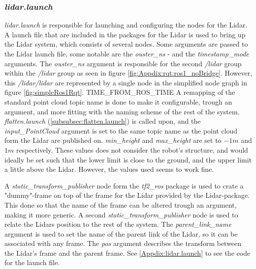 \subsubsection{\textit{lidar.launch}}\label{subsubsec:lidar.launch}
\textit{lidar.launch} is responsible for launching and configuring the nodes for the Lidar. A launch file that are included in the packages for the Lidar is used to bring up the Lidar system, which  consists of several nodes. Some arguments are passed to the Lidar launch file, some notable are the \textit{ouster\_ns} - and the  \textit{timestamp\_mode} arguments. The \textit{ouster\_ns} argument is responsible for the second \textit{/lidar} group within the \textit{/lidar} group as seen in figure \ref{fig:Appdix:rqt:ros1_noBridge}. However, this \textit{/lidar/lidar} are represented by a single node in the simplified node graph in figure \ref{fig:simpleRos1Rqt}. TIME\_FROM\_ROS\_TIME A remapping of the standard point cloud topic name is done to make it configurable, trough an argument, and more fitting with the naming scheme of the rest of the system. \textit{flatten.launch} (\ref{subsubsec:flatten.launch}) is called upon, and the \textit{input\_PointCloud} argument is set to the same topic name as the point cloud form the Lidar are published on. \textit{min\_height} and \textit{max\_height} are set to $-1 m$ and $1 m$ respectively. These values does not consider the robot's structure, and would ideally be set such that the lower limit is close to the ground, and the upper limit a little above the Lidar. However, the values used seems to work fine. 

A \textit{static\_transform\_publisher} node form the \textit{tf2\_ros} package is used to crate a "dummy"-frame on top of the frame for the Lidar provided by the Lidar-package. This done so that the name of the frame can be altered trough an argument, making it more generic. A second \textit{static\_transform\_publisher} node is used to relate the Lidars position to the rest of the system. The \textit{parent\_link\_name} argument is used to set the name of the parent link of the Lidar, so it can be associated with any frame. The \textit{pos} argument describes the transform between the Lidar's frame and the parent frame. See \ref{Appdix:lidar.launch} to see the code for the launch file.

